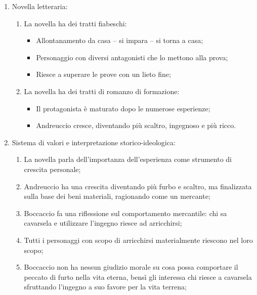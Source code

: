 \documentclass{article}
\begin{document}
\begin{enumerate}
\begin{enumerate}[label*=\arabic*.]
        \end{enumerate}
    \item Novella letteraria:
        \begin{enumerate}[label*=\arabic*.]
            \item La novella ha dei tratti fiabeschi:
                \begin{itemize}
                    \item Allontanamento da casa -- si impara -- si torna a casa;
                    \item Personaggio con diversi antagonisti che lo mettono alla prova;
                    \item Riesce a superare le prove con un lieto fine; 
                \end{itemize}
            \item La novella ha dei tratti di romanzo di formazione:
                \begin{itemize}
                    \item Il protagonista è maturato dopo le numerose esperienze;
                    \item Andreuccio cresce, diventando più scaltro, ingegnoso e più ricco.
                \end{itemize}
        \end{enumerate}
    \item Sistema di valori e interpretazione storico-ideologica:
        \begin{enumerate}[label*=\arabic*.]
            \item La novella parla dell'importanza dell'esperienza come strumento di crescita
                personale;
            \item Andreuccio ha una crescita diventando più furbo e scaltro, ma finalizzata
                sulla base dei beni materiali, ragionando come un mercante;
            \item Boccaccio fa una riflessione sul comportamento mercantile: chi sa cavarsela
                e utilizzare l'ingegno riesce ad arricchirsi;
            \item Tutti i personaggi con scopo di arricchirsi materialmente riescono nel loro
                scopo;
            \item Boccaccio non ha nessun giudizio morale su cosa possa comportare il peccato
                di furto nella vita eterna, bensì gli interessa chi riesce a cavarsela
                sfruttando l'ingegno a suo favore per la vita terrena;
        \end{enumerate}
\end{enumerate}
\end{document}
